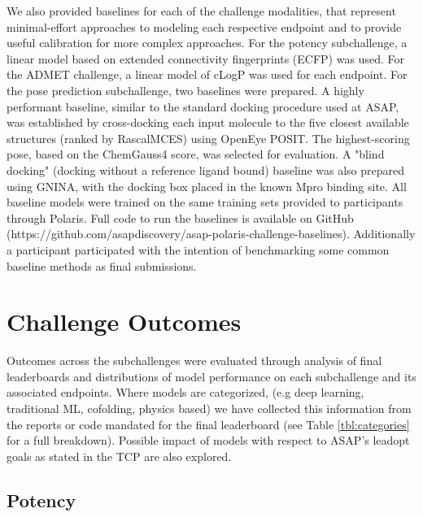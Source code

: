 \documentclass[journal=jcim,manuscript=article]{achemso}
\begin{document}
We also provided baselines for each of the challenge modalities, that represent minimal-effort approaches to modeling each respective endpoint and to provide useful calibration for more complex approaches. For the potency subchallenge, a linear model based on extended connectivity fingerprints (ECFP)\cite{ecfp_2010} was used. For the ADMET challenge, a linear model of cLogP\cite{clogp_1999} was used for each endpoint. For the pose prediction subchallenge, two baselines were prepared. A highly performant baseline, similar to the standard docking procedure used at ASAP, was established by cross-docking each input molecule to the five closest available structures (ranked by RascalMCES\cite{raymond_rascal_2002, rdkit}) using OpenEye POSIT\cite{kelley_posit_2015}. The highest-scoring pose, based on the ChemGauss4\cite{oetk} score, was selected for evaluation. A "blind docking" (docking without a reference ligand bound) baseline was also prepared using GNINA\cite{mcnutt_gnina_2025}, with the docking box placed in the known Mpro binding site. All baseline models were trained on the same training sets provided to participants through Polaris. Full code to run the baselines is available on GitHub (https://github.com/asapdiscovery/asap-polaris-challenge-baselines). Additionally a participant participated with the intention of benchmarking some common baseline methods as final submissions\cite{beauty_baseline_2025}. 

\section{Challenge Outcomes}

Outcomes across the subchallenges were evaluated through analysis of final leaderboards and distributions of model performance on each subchallenge and its associated endpoints. Where models are categorized, (e.g deep learning, traditional ML, cofolding, physics based) we have collected this information from the reports or code mandated for the final leaderboard (see Table \ref{tbl:categories} for a full breakdown). Possible impact of models with respect to ASAP's leadopt goals as stated in the TCP\cite{sars_mers_tcp} are also explored. 

\subsection{Potency}
\end{document}
